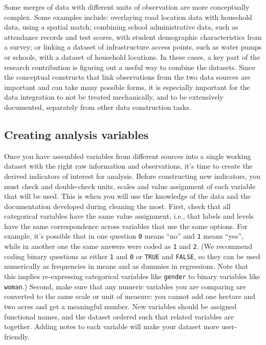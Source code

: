 Some merges of data with different units of observation 
are more conceptually complex.
Some examples include: overlaying road location data with household data,
using a spatial match; combining school administrative data, such as attendance records and test scores,
with student demographic characteristics from a survey;
or linking a dataset of infrastructure access points, such as water pumps or schools,
with a dataset of household locations.
In these cases, a key part of the research contribution is figuring out 
a useful way to combine the datasets.
Since the conceptual constructs that link observations from the two data sources
are important and can take many possible forms,
it is especially important for the data integration to not be treated mechanically,
and to be extensively documented, separately from other data construction tasks.


\subsection{Creating analysis variables}

Once you have assembled variables from different sources into a single working dataset
with the right raw information and observations,
it's time to create the derived indicators of interest for analysis. 
Before constructing new indicators,
you must check and double-check units, scales and value assignment of each variable that will be used.
This is when you will use the knowledge of the data and the documentation developed during cleaning the most.
First, check that all categorical variables have the same value assignment, i.e.,
that labels and levels have the same correspondence across variables that use the same options.
For example, it's possible that in one question \texttt{0} means ``no'' and \texttt{1} means ``yes'',
while in another one the same answers were coded as \texttt{1} and \texttt{2}.
(We recommend coding binary questions as either \texttt{1} and \texttt{0} or \texttt{TRUE} and \texttt{FALSE},
so they can be used numerically as frequencies in means and as dummies in regressions.
Note that this implies re-expressing categorical variables like \texttt{gender} to binary variables like \texttt{woman}.)
Second, make sure that any numeric variables you are comparing are converted to the same scale or unit of measure:
you cannot add one hectare and two acres and get a meaningful number.
New variables should be assigned functional names, 
and the dataset ordered such that related variables are together.
Adding notes to each variable will make your dataset more user-friendly.

